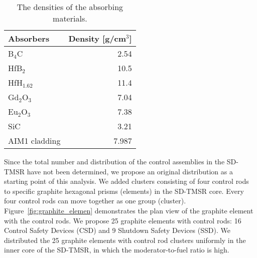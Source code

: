 \begin{table}[b!]
	\caption{The densities of the absorbing materials.}
	\vspace{0.05in}
	\begin{center}	
		\begin{tabular}{l  r}  %
			\hline
			Absorbers & Density [g/cm$^3$]\\
			\hline
			B$_4$C   &  2.54 \\
			HfB$_2$   &  10.5 \\
			HfH$_{1.62}$  &  11.4 \\
			Gd$_2$O$_3$   &  7.04 \\
			Eu$_2$O$_3$  &  7.38 \\
			SiC   & 3.21 \\
			AIM1 cladding   & 7.987 \\
			\hline
		\end{tabular}
		\label{tab:table111}
	\end{center}
\end{table}

%
%
%
%
%

Since the total number and distribution of the control assemblies in the SD-TMSR have not been determined, we propose an original distribution as a starting point of this analysis. We added clusters consisting of four control rods to specific graphite hexagonal prisms (elements) in the SD-TMSR core. Every four control rods can move together as one group (cluster). Figure~\ref{fig:graphite_elemen} demonstrates the plan view of the graphite element with the control rods. We propose 25 graphite elements with control rods: 16 Control Safety Devices (CSD) and 9 Shutdown Safety Devices (SSD). We distributed the 25 graphite elements with control rod clusters uniformly in the inner core of the SD-TMSR, in which the moderator-to-fuel ratio is high.

